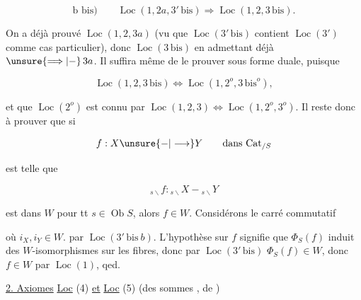 \[
\text{b bis)}\qquad\operatorname{Loc}(1,2a,3'\,\mathrm{bis})\Longrightarrow\operatorname{Loc}(1,2,3\,\mathrm{bis}).
\]

On  a déjà prouvé $\operatorname{Loc}(1,2,3a)$  (vu que $\operatorname{Loc}(3'\,\mathrm{bis})$ contient $\operatorname{Loc}(3')$ comme cas particulier),  donc $\operatorname{Loc}(3\,\mathrm{bis})$ en admettant déjà $\unsure{\Longrightarrow|{-}}\,3a$. Il suffira même de le prouver sous forme duale, puisque

\[
\operatorname{Loc}(1,2,3\,\mathrm{bis})\Longleftrightarrow\operatorname{Loc}(1,2^{o},3\,\mathrm{bis}^{o}),
\]



et que $\operatorname{Loc}(2^o)$ est connu par $\operatorname{Loc}(1,2,3)\Longleftrightarrow\operatorname{Loc}(1,2^o,3^o)$. Il reste donc à prouver que si

\[
f:X\unsure{{-}|\longrightarrow}Y\qquad\text{dans }\mathrm{Cat}_{/S}
\]

est telle que 

\[
{}_{s\backslash}f:{}_{s\backslash}X{-}{}_{s\backslash}Y
\]

est dans $W$ pour tt $s\in\operatorname{Ob}S$, alors $f\in W$. Considérons  le carré commutatif


où $i_X,i_Y\in W$. par $\operatorname{Loc}(3'\,\mathrm{bis}\ b)$. L'hypothèse sur $f$ signifie que $\Phi_S(f)$ induit des $W$-isomorphismes sur les fibres, donc par $\operatorname{Loc}(3'\,\mathrm{bis})$ $\Phi_S(f)\in W$, donc $f\in W$ par $\operatorname{Loc}(1)$, qed.

\uline{2. Axiomes} \uline{Loc} (4) \uline{et} \uline{Loc} (5) (des sommes , de )


